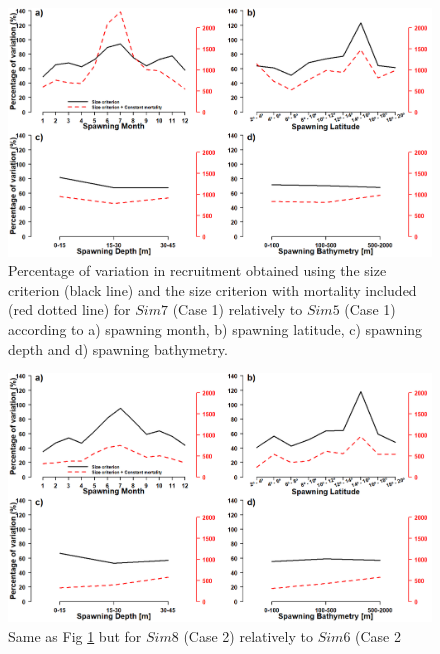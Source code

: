 \begin{figure}[H]
	\includegraphics[width=1.0\textwidth]{figures/Chap3Case1f1.png}
	\centering
	\caption{Percentage of variation in recruitment obtained using the size criterion (black line) and the size criterion with mortality included (red dotted line) for $Sim 7$ (Case 1) relatively to $Sim 5$ (Case 1) according to a) spawning month, b) spawning latitude, c) spawning depth and d) spawning bathymetry.}
	\label{Chap3Case1f1}
\end{figure}

\begin{figure}[H]
	\includegraphics[width=1.0\textwidth]{figures/Chap3Case2f1.png}
	\centering
	\caption{Same as Fig \ref{Chap3Case1f1} but for $Sim 8$ (Case 2) relatively to $Sim 6$ (Case 2}
	\label{Chap3Case2f1}
\end{figure}

